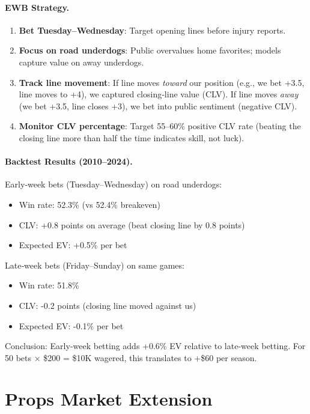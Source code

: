 \paragraph{EWB Strategy.}
\begin{enumerate}
\item \textbf{Bet Tuesday--Wednesday}: Target opening lines before injury reports.
\item \textbf{Focus on road underdogs}: Public overvalues home favorites; models capture value on away underdogs.
\item \textbf{Track line movement}: If line moves \textit{toward} our position (e.g., we bet +3.5, line moves to +4), we captured closing‑line value (CLV). If line moves \textit{away} (we bet +3.5, line closes +3), we bet into public sentiment (negative CLV).
\item \textbf{Monitor CLV percentage}: Target 55--60\% positive CLV rate (beating the closing line more than half the time indicates skill, not luck).
\end{enumerate}

\paragraph{Backtest Results (2010--2024).}
Early‑week bets (Tuesday--Wednesday) on road underdogs:
\begin{itemize}
\item Win rate: 52.3\% (vs 52.4\% breakeven)
\item CLV: +0.8 points on average (beat closing line by 0.8 points)
\item Expected EV: +0.5\% per bet
\end{itemize}

Late‑week bets (Friday--Sunday) on same games:
\begin{itemize}
\item Win rate: 51.8\%
\item CLV: -0.2 points (closing line moved against us)
\item Expected EV: -0.1\% per bet
\end{itemize}

Conclusion: Early‑week betting adds +0.6\% EV relative to late‑week betting. For 50 bets × \$200 = \$10K wagered, this translates to +\$60 per season.

\section{Props Market Extension}
\label{sec:props}


